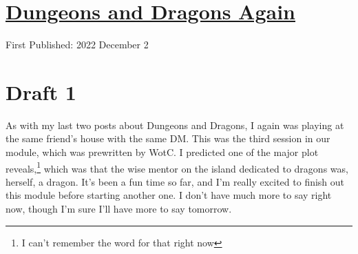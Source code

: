 \documentclass[12pt]{article}[titlepage]
\renewcommand{\,}{\textsuperscript{,}}
\begin{document}
\doublespacing
\section{\href{dungeons-dragons-3.html}{Dungeons and Dragons Again}}
First Published: 2022 December 2

\section{Draft 1}
As with my last two posts about Dungeons and Dragons, I again was playing at the same friend's house with the same DM.
This was the third session in our module, which was prewritten by WotC.
I predicted one of the major plot reveals,\footnote{I can't remember the word for that right now} which was that the wise mentor on the island dedicated to dragons was, herself, a dragon.
It's been a fun time so far, and I'm really excited to finish out this module before starting another one.
I don't have much more to say right now, though I'm sure I'll have more to say tomorrow.
\end{document}
